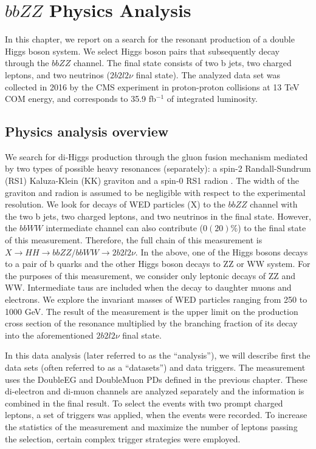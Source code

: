 \chapter{$bbZZ$ Physics Analysis}

In this chapter, we report on a search for the resonant production of a double Higgs boson system. We select Higgs boson pairs that subsequently decay through the $bbZZ$ channel. The final state consists of two b jets, two charged leptons, and two neutrinos ($2 b 2 l 2 \nu$ final state). The analyzed data set was collected in 2016 by the CMS experiment in proton-proton collisions at 13 TeV COM energy, and corresponds to 35.9 fb$^{-1}$ of integrated luminosity. 

\section{Physics analysis overview}
\label{sec:an_overview}

We search for di-Higgs production through the gluon fusion mechanism mediated by two types of possible heavy resonances (separately): a spin-2 Randall-Sundrum (RS1) Kaluza-Klein (KK) graviton and a spin-0 RS1 radion \cite{WED, Xanda}. The width of the graviton and radion is assumed to be negligible with respect to the experimental resolution. We look for decays of WED particles (X) to the $bbZZ$ channel with the two b jets, two charged leptons, and two neutrinos in the final state. However,  the $bbWW$ intermediate channel can also contribute ($0(20)\%$) to the final state of this measurement. Therefore, the full chain of this measurement is $X \rightarrow HH \rightarrow bbZZ/bbWW \rightarrow 2 b 2l 2 \nu$. In the above, one of the Higgs bosons decays to a pair of b quarks and the other Higgs boson decays to ZZ or WW system. For the purposes of this measurement, we consider only leptonic decays of ZZ and WW. Intermediate taus are included when the decay to daughter muons and electrons. We explore the invariant masses of WED particles ranging from 250 to 1000 GeV. The result of the measurement is the upper limit on the production cross section of the resonance multiplied by the branching fraction of its decay into the aforementioned $2 b 2 l 2 \nu$ final state. 

In this data analysis (later referred to as the ``analysis''), we will describe first the data sets (often referred to as a ``datasets'') and data triggers. The measurement uses the DoubleEG and DoubleMuon PDs defined in the previous chapter. These di-electron and di-muon channels are analyzed separately and the information is combined in the final result. To select the events with two prompt charged leptons, a set of triggers was applied, when the events were recorded. To increase the statistics of the measurement and maximize the number of leptons passing the selection, certain complex trigger strategies were employed. 

